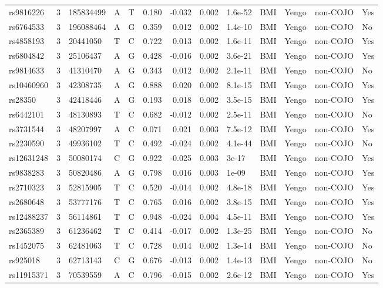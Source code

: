 \documentclass[11pt,twoside]{bristolthesis}
\begin{document}
\begin{longtable}[t]{lrlllrrrlllll}
\addlinespace
rs9816226 & 3 & 185834499 & A & T & 0.180 & -0.032 & 0.002 & 1.6e-52 & BMI & Yengo & non-COJO & Yes\\
rs6764533 & 3 & 196088464 & A & G & 0.359 & 0.012 & 0.002 & 1.4e-10 & BMI & Yengo & non-COJO & No\\
rs4858193 & 3 & 20441050 & T & C & 0.722 & 0.013 & 0.002 & 1.6e-11 & BMI & Yengo & non-COJO & Yes\\
rs6804842 & 3 & 25106437 & A & G & 0.428 & -0.016 & 0.002 & 3.6e-21 & BMI & Yengo & non-COJO & Yes\\
rs9814633 & 3 & 41310470 & A & G & 0.343 & 0.012 & 0.002 & 2.1e-11 & BMI & Yengo & non-COJO & No\\
\addlinespace
rs10460960 & 3 & 42308735 & A & G & 0.888 & 0.020 & 0.002 & 8.1e-15 & BMI & Yengo & non-COJO & Yes\\
rs28350 & 3 & 42418446 & A & G & 0.193 & 0.018 & 0.002 & 3.5e-15 & BMI & Yengo & non-COJO & Yes\\
rs6442101 & 3 & 48130893 & T & C & 0.682 & -0.012 & 0.002 & 2.5e-11 & BMI & Yengo & non-COJO & No\\
rs3731544 & 3 & 48207997 & A & C & 0.071 & 0.021 & 0.003 & 7.5e-12 & BMI & Yengo & non-COJO & Yes\\
rs2230590 & 3 & 49936102 & T & C & 0.492 & -0.024 & 0.002 & 4.1e-44 & BMI & Yengo & non-COJO & No\\
\addlinespace
rs12631248 & 3 & 50080174 & C & G & 0.922 & -0.025 & 0.003 & 3e-17 & BMI & Yengo & non-COJO & Yes\\
rs9838283 & 3 & 50820486 & A & G & 0.798 & 0.016 & 0.003 & 1e-09 & BMI & Yengo & non-COJO & Yes\\
rs2710323 & 3 & 52815905 & T & C & 0.520 & -0.014 & 0.002 & 4.8e-18 & BMI & Yengo & non-COJO & Yes\\
rs2680648 & 3 & 53777176 & T & C & 0.765 & 0.016 & 0.002 & 3.8e-15 & BMI & Yengo & non-COJO & Yes\\
rs12488237 & 3 & 56114861 & T & C & 0.948 & -0.024 & 0.004 & 4.5e-11 & BMI & Yengo & non-COJO & Yes\\
\addlinespace
rs2365389 & 3 & 61236462 & T & C & 0.414 & -0.017 & 0.002 & 1.3e-25 & BMI & Yengo & non-COJO & No\\
rs1452075 & 3 & 62481063 & T & C & 0.728 & 0.014 & 0.002 & 1.3e-14 & BMI & Yengo & non-COJO & No\\
rs925018 & 3 & 62713143 & C & G & 0.676 & -0.013 & 0.002 & 1.4e-13 & BMI & Yengo & non-COJO & No\\
rs11915371 & 3 & 70539559 & A & C & 0.796 & -0.015 & 0.002 & 2.6e-12 & BMI & Yengo & non-COJO & Yes\\

\end{longtable}
\end{document}
